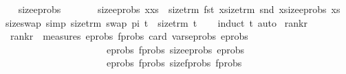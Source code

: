 \begin{isabellebody}
\ \ \isanewline
\ {\isachardoublequoteopen}size{\isacharunderscore}{\kern0pt}eprobs\ {\isacharbrackleft}{\kern0pt}{\isacharbrackright}{\kern0pt}\ {\isacharequal}{\kern0pt}\ {}{\isachardoublequoteclose}\ {\isacharbar}{\kern0pt}\ \isanewline
\ \ {\isachardoublequoteopen}size{\isacharunderscore}{\kern0pt}eprobs\ {\isacharparenleft}{\kern0pt}x{\isacharhash}{\kern0pt}xs{\isacharparenright}{\kern0pt}\ {\isacharequal}{\kern0pt}\ {\isacharparenleft}{\kern0pt}size{\isacharunderscore}{\kern0pt}trm\ {\isacharparenleft}{\kern0pt}fst\ x{\isacharparenright}{\kern0pt}{\isacharparenright}{\kern0pt}{\isacharplus}{\kern0pt}{\isacharparenleft}{\kern0pt}size{\isacharunderscore}{\kern0pt}trm\ {\isacharparenleft}{\kern0pt}snd\ x{\isacharparenright}{\kern0pt}{\isacharparenright}{\kern0pt}{\isacharplus}{\kern0pt}{\isacharparenleft}{\kern0pt}size{\isacharunderscore}{\kern0pt}eprobs\ xs{\isacharparenright}{\kern0pt}{\isachardoublequoteclose}\isanewline
\isanewline
\isanewline
{}\isamarkupfalse%
\ size{\isacharunderscore}{\kern0pt}swap\ {\isacharbrackleft}{\kern0pt}simp{\isacharbrackright}{\kern0pt}{\isacharcolon}{\kern0pt}\ {\isachardoublequoteopen}size{\isacharunderscore}{\kern0pt}trm\ {\isacharparenleft}{\kern0pt}swap\ pi\ t{\isacharparenright}{\kern0pt}\ {\isacharequal}{\kern0pt}\ size{\isacharunderscore}{\kern0pt}trm\ t{\isachardoublequoteclose}\isanewline
%
\isadelimproof
\ \ %
\endisadelimproof
%
\isatagproof
{}\isamarkupfalse%
\ {\isacharparenleft}{\kern0pt}induct\ t{\isacharparenright}{\kern0pt}\ auto%
\endisatagproof
{\isafoldproof}%
%
\isadelimproof
\isanewline
%
\endisadelimproof
\isanewline
{}\isamarkupfalse%
\ rank{\isacharunderscore}{\kern0pt}r\isanewline
\ \ \isanewline
\ \ {\isachardoublequoteopen}rank{\isacharunderscore}{\kern0pt}r\ {\isacharequal}{\kern0pt}\ measures\ {\isacharbrackleft}{\kern0pt}{\isasymlambda}{\isacharparenleft}{\kern0pt}eprobs{\isacharcomma}{\kern0pt}\ fprobs{\isacharparenright}{\kern0pt}{\isachardot}{\kern0pt}\ card\ {\isacharparenleft}{\kern0pt}vars{\isacharunderscore}{\kern0pt}eprobs\ eprobs{\isacharparenright}{\kern0pt}{\isacharcomma}{\kern0pt}\isanewline
\ \ \ \ \ \ \ \ \ \ \ \ \ \ \ \ \ \ \ \ \ \ {\isasymlambda}{\isacharparenleft}{\kern0pt}eprobs{\isacharcomma}{\kern0pt}\ fprobs{\isacharparenright}{\kern0pt}{\isachardot}{\kern0pt}\ size{\isacharunderscore}{\kern0pt}eprobs\ eprobs{\isacharcomma}{\kern0pt}\ \isanewline
\ \ \ \ \ \ \ \ \ \ \ \ \ \ \ \ \ \ \ \ \ \ {\isasymlambda}{\isacharparenleft}{\kern0pt}eprobs{\isacharcomma}{\kern0pt}\ fprobs{\isacharparenright}{\kern0pt}{\isachardot}{\kern0pt}\ size{\isacharunderscore}{\kern0pt}fprobs\ fprobs{\isacharbrackright}{\kern0pt}{\isachardoublequoteclose}\isanewline

\end{isabellebody}
